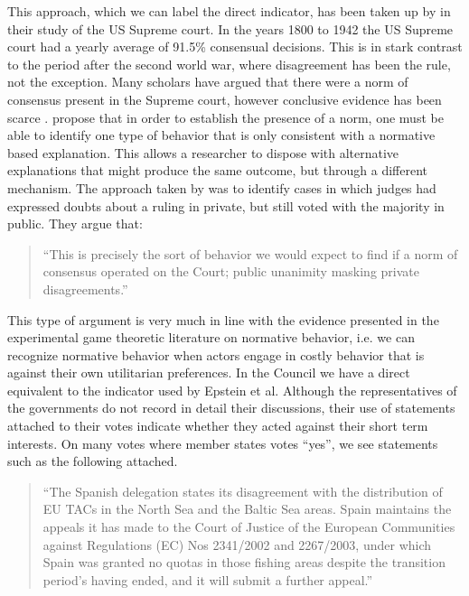 This approach, which we can label the direct indicator, has been taken up by \citet{EpsteinSegalSpaeth2001} in their study of the US Supreme court. In the years 1800 to 1942 the US Supreme court had a yearly average of 91.5\% consensual decisions. This is in stark contrast to the period after the second world war, where disagreement has been the rule, not the exception.  Many scholars have argued that there were a norm of consensus present in the Supreme court, however conclusive evidence has been scarce \citep{Haynie1992,EpsteinKnight1996,CalderiaZorn1998,EpsteinSegalSpaeth2001}. \citet{EpsteinSegalSpaeth2001} propose that in order to establish the presence of a norm, one must be able to identify one type of behavior that is only consistent with a normative based explanation. This allows a researcher to dispose with alternative explanations that might produce the same outcome, but through a different mechanism. The approach taken by \citet{EpsteinSegalSpaeth2001} was to identify cases in which judges had expressed doubts about a ruling in private, but still voted with the majority in public.  They argue that:

\begin{quote}
  ``This is precisely the sort of behavior we would expect to find if a norm of consensus operated on the Court; public unanimity masking private disagreements.''
\end{quote}

This type of argument is very much in line with the evidence presented in the experimental game theoretic literature on normative behavior, i.e. we can recognize normative behavior when actors engage in costly behavior that is against their own utilitarian preferences. In the Council we have a direct equivalent to the indicator used by Epstein et al. Although the representatives of the governments do not record in detail their discussions, their use of statements attached to their votes indicate whether they acted against their short term interests. On many votes where member states votes ``yes'', we see statements such as the following attached.

\begin{quote}
  ``The Spanish delegation states its disagreement with the distribution of EU TACs in the North Sea and the Baltic Sea areas. Spain maintains the appeals it has made to the Court of Justice of the European Communities against Regulations (EC) Nos 2341/2002 and 2267/2003, under which Spain was granted no quotas in those fishing areas despite the transition period’s having ended, and it will submit a further appeal.''
\end{quote}

